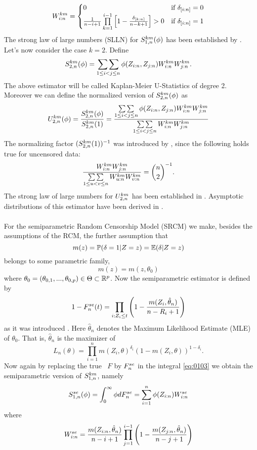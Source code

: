 \[ W_{i:n}^{km} = \begin{cases} 
0 & \textrm{if } \delta_{[i:n]} = 0 \\
\frac{1}{n-i+1}\prod\limits_{k=1}^{i-1}\left[1-\frac{\delta_{[k:n]}}{n-k+1}\right] > 0 & \textrm{if } \delta_{[i:n]} = 1
\end{cases}
\]
%
The strong law of large numbers (SLLN) for $S_{1,n}^{km}(\phi)$ has been established by \citet{stute1993strong}.
%
Let's now consider the case $k=2$. Define
\begin{equation*}
S_{2,n}^{km}(\phi) = \mathop{\sum\sum}\limits_{1\leq i < j \leq n} \phi(Z_{i:n}, Z_{j:n}) W_{i:n}^{km} W_{j:n}^{km}.
\end{equation*}
The above estimator will be called Kaplan-Meier U-Statistics of degree 2. Moreover we can define the normalized version of $S_{2,n}^{km}(\phi)$ as
$$U_{2,n}^{km}(\phi) = \frac{S_{2,n}^{km}(\phi)}{S_{2,n}^{km}(1)} = \frac{\mathop{\sum\sum}\limits_{1\leq i < j \leq n} \phi(Z_{i:n}, Z_{j:n}) W_{i:n}^{km} W_{j:n}^{km}}{\mathop{\sum\sum}\limits_{1\leq i < j \leq n} W_{i:n}^{km} W_{j:n}^{km}}$$ 
The normalizing factor $(S_{2,n}^{km}(1))^{-1}$ was introduced by \cite{bose1999strong}, since the following holds true for uncensored data:
$$\frac{W_{i:n}^{km}W_{j:n}^{km}}{\mathop{\sum\sum}\limits_{1\leq u < v \leq n}W_{u:n}^{km}W_{v:n}^{km}} = \binom{n}{2}^{-1}\textrm{.}$$ 
The strong law of large numbers for $U_{2,n}^{km}$ has been established in \citet{bose1999strong}. Asymptotic distributions of this estimator have been derived in \citet{bose2002asymptotic}. \\
\\
For the semiparametric Random Censorship Model (SRCM) we make, besides the assumptions of the RCM, the further assumption that 
$$m(z) = \mathbb{P}(\delta=1|Z=z) = \mathbb{E}(\delta|Z=z)$$
belongs to some parametric family, \ie\
$$m(z) = m(z,\theta_0)$$
where $\theta_0=(\theta_{0,1},...,\theta_{0,p})\in \Theta \subset \mathbb{R}^p$. Now the semiparametric estimator is defined by
$$1-F_n^{se}(t) = \prod\limits_{i:Z_i\leq t}\left(1-\frac{m(Z_i,\hat{\theta}_n)}{n-R_i+1}\right)$$
as it was introduced \citet{dikta2000strong}. Here $\hat{\theta}_n$ denotes the Maximum Likelihood Estimate (MLE) of $\theta_0$. That is, $\hat{\theta}_n$ is the maximizer of 
$$L_n(\theta)=\prod\limits_{i=1}^{n} m(Z_i,\theta)^{\delta_i}(1-m(Z_i,\theta))^{1-\delta_i}.$$
Now again by replacing the true \df\ $F$ by $F_n^{se}$ in the integral \eqref{eq:0103} we obtain the semiparametric version of $S_{1,n}^{km}$, namely
$$S_{1,n}^{se}(\phi)=\int_0^\infty \phi dF_n^{se} = \sum\limits_{i=1}^n \phi(Z_{i:n})W_{i:n}^{se}$$
where 
$$W_{i:n}^{se} = \frac{m(Z_{i:n}, \hat{\theta}_n)}{n-i+1} \prod\limits_{j=1}^{i-1}\left(1-\frac{m(Z_{j:n}, \hat{\theta}_n)}{n-j+1}\right)$$
